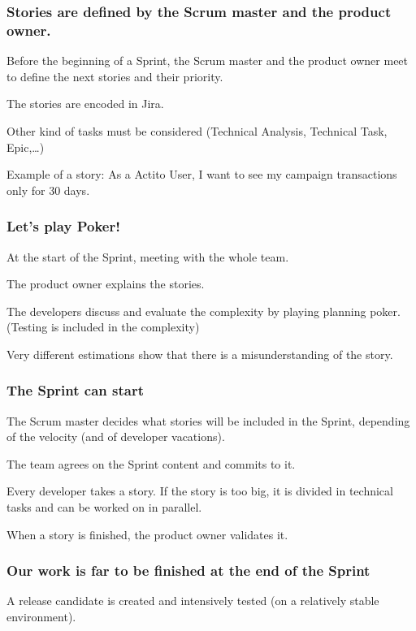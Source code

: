 \documentclass[a4paper, 11pt]{article}
\begin{document}
    \subsubsection{Stories are defined by the Scrum master and the product owner.}

    Before the beginning of a Sprint, the Scrum master and the product owner meet to define
    the next stories and their priority.

    The stories are encoded in Jira.

    Other kind of tasks must be considered (Technical Analysis, Technical Task, Epic,\ldots)

    Example of a story: As a Actito User, I want to see my campaign transactions only for
    30 days.

    \subsubsection{Let's play Poker!}

    At the start of the Sprint, meeting with the whole team.

    The product owner explains the stories.

    The developers discuss and evaluate the complexity by playing planning poker. (Testing is included in the complexity)

    Very different estimations show that there is a misunderstanding of the story.

    \subsubsection{The Sprint can start}

    The Scrum master decides what stories will be included in the Sprint, depending of the velocity (and of developer vacations).

    The team agrees on the Sprint content and commits to it.

    Every developer takes a story. If the story is too big, it is divided in technical tasks and can be worked on in parallel.

    When a story is finished, the product owner validates it.

    \subsubsection{Our work is far to be finished at the end of the Sprint}

    A release candidate is created and intensively tested (on a relatively stable environment).
\end{document}

